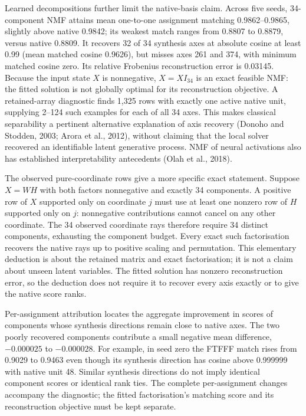\documentclass[
  british,
  11pt,
  a4paper,
]{article}
\begin{document}
Learned decompositions further limit the native-basis claim. Across five
seeds, 34-component NMF attains mean one-to-one assignment matching
0.9862--0.9865, slightly above native 0.9842; its weakest match ranges
from 0.8807 to 0.8879, versus native 0.8809. It recovers 32 of 34
synthesis axes at absolute cosine at least 0.99 (mean matched cosine
0.9626), but misses axes 261 and 374, with minimum matched cosine zero.
Its relative Frobenius reconstruction error is 0.03145. Because the
input state \(X\) is nonnegative, \(X=X I_{34}\) is an exact feasible
NMF: the fitted solution is not globally optimal for its reconstruction
objective. A retained-array diagnostic finds 1,325 rows with exactly one
active native unit, supplying 2--124 such examples for each of all 34
axes. This makes classical separability a pertinent alternative
explanation of axis recovery (Donoho and Stodden, 2003; Arora et al.,
2012), without claiming that the local solver recovered an identifiable
latent generative process. NMF of neural activations also has
established interpretability antecedents (Olah et al., 2018).

The observed pure-coordinate rows give a more specific exact statement.
Suppose \(X=WH\) with both factors nonnegative and exactly 34
components. A positive row of \(X\) supported only on coordinate \(j\)
must use at least one nonzero row of \(H\) supported only on \(j\):
nonnegative contributions cannot cancel on any other coordinate. The 34
observed coordinate rays therefore require 34 distinct components,
exhausting the component budget. Every exact such factorisation recovers
the native rays up to positive scaling and permutation. This elementary
deduction is about the retained matrix and exact factorisation; it is
not a claim about unseen latent variables. The fitted solution has
nonzero reconstruction error, so the deduction does not require it to
recover every axis exactly or to give the native score ranks.

Per-assignment attribution locates the aggregate improvement in scores
of components whose synthesis directions remain close to native axes.
The two poorly recovered components contribute a small negative mean
difference, \(-0.000025\) to \(-0.000028\). For example, in seed zero
the FTFFF match rises from 0.9029 to 0.9463 even though its synthesis
direction has cosine above 0.999999 with native unit 48. Similar
synthesis directions do not imply identical component scores or
identical rank ties. The complete per-assignment changes accompany the
diagnostic; the fitted factorisation's matching score and its
reconstruction objective must be kept separate.
\end{document}
